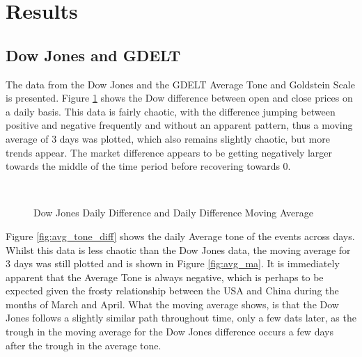\section{Results}
\subsection{Dow Jones and GDELT}
The data from the Dow Jones and the GDELT Average Tone and Goldstein Scale is presented. Figure \ref{fig:dow_diff} shows the Dow difference between open and close prices on a daily basis. This data is fairly chaotic, with the difference jumping between positive and negative frequently and without an apparent pattern, thus a moving average of 3 days was plotted, which also remains slightly chaotic, but more trends appear. The market difference appears to be getting negatively larger towards the middle of the time period before recovering towards 0. 

\begin{figure}[H]
	\centering
	\\
	\caption{Dow Jones Daily Difference and Daily Difference Moving Average}
	\label{fig:dow_diff}
\end{figure}

Figure \ref{fig:avg_tone_diff} shows the daily Average tone of the events across days. Whilst this data is less chaotic than the Dow Jones data, the moving average for 3 days was still plotted and is shown in Figure \ref{fig:avg_ma}. It is immediately apparent that the Average Tone is always negative, which is perhaps to be expected given the frosty relationship between the USA and China during the months of March and April. What the moving average shows, is that the Dow Jones follows a slightly similar path throughout time, only a few dats later, as the trough in the moving average for the Dow Jones difference occurs a few days after the trough in the average tone.

